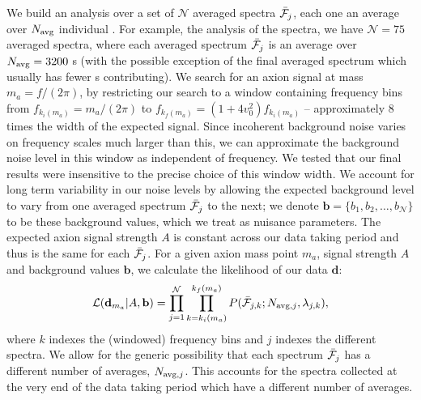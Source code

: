 \documentclass[aps,prd,amsmath,amssymb,reprint,superscriptaddress, nofootinbib,
]{revtex4-1}
\begin{document}
We build an analysis over a set of $\mathcal{N}$ averaged spectra $\bar{\mathcal{F}}_j$, each one an average over $N_{\rm avg}$ individual \PSD. For example, the analysis of the \Pten spectra, we have $\mathcal{N}=75$ averaged spectra, where each averaged spectrum $\bar{\mathcal{F}}_j$ is an average over $N_{\rm avg}=3200$ {\PSD}s (with the possible exception of the final averaged spectrum which usually has fewer {\PSD}s contributing). We search for an axion signal at mass $m_a=f/(2\pi)$, by restricting our search to a window containing frequency bins from $f_{k_i(m_a)}=m_a/(2\pi)$ to $f_{k_f(m_a)}=(1 + 4v_0^2)f_{k_i(m_a)}$ -- approximately 8 times the width of the expected signal. Since incoherent background noise varies on frequency scales much larger than this, we can approximate the background noise level in this window as independent of frequency. We tested that our final results were insensitive to the precise choice of this window width. We account for long term variability in our noise levels by allowing the expected background level to vary from one averaged spectrum $\bar{\mathcal{F}}_j$ to the next; we denote $\mathbf{b}=\{b_1,b_2,\dots,b_\mathcal{N}\}$ to be these background values, which we treat as nuisance parameters. The expected axion signal strength $A$ is constant across our data taking period and thus is the same for each $\bar{\mathcal{F}}_j$. For a given axion mass point $m_a$, signal strength $A$ and background values $\mathbf{b}$, we calculate the likelihood of our data $\mathbf{d}$:
\begin{equation}
\label{eq:LikelihoodFull}
\mathcal{L}(\mathbf{d}_{m_a}|A,\mathbf{b}) = \prod_{j = 1}^{\mathcal{N}}\prod_{k = k_i(m_a)}^{k_f(m_a)} P(\bar{\mathcal{F}}_{j,k};N_{{\rm avg},j},\lambda_{j,k}),
\end{equation}
where $k$ indexes the (windowed) frequency bins and $j$ indexes the different spectra. We allow for the generic possibility that each spectrum $\bar{\mathcal{F}}_j$ has a different number of averages, $N_{{\rm avg}, j}$. This accounts for the spectra collected at the very end of the data taking period which have a different number of averages. 
\end{document}
